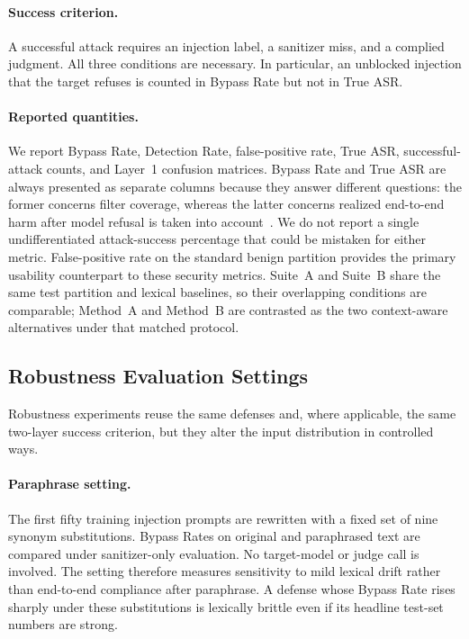 \paragraph{Success criterion.}
A successful attack requires an injection label, a sanitizer miss, and a complied judgment.
All three conditions are necessary.
In particular, an unblocked injection that the target refuses is counted in Bypass Rate but not in True ASR.

\paragraph{Reported quantities.}
We report Bypass Rate, Detection Rate, false-positive rate, True ASR, successful-attack counts, and Layer~1 confusion matrices.
Bypass Rate and True ASR are always presented as separate columns because they answer different questions: the former concerns filter coverage, whereas the latter concerns realized end-to-end harm after model refusal is taken into account~\cite{zizzo2025adversarial,yi2024jailbreak}.
We do not report a single undifferentiated attack-success percentage that could be mistaken for either metric.
False-positive rate on the standard benign partition provides the primary usability counterpart to these security metrics.
Suite~A and Suite~B share the same test partition and lexical baselines, so their overlapping conditions are comparable; Method~A and Method~B are contrasted as the two context-aware alternatives under that matched protocol.

\subsection{Robustness Evaluation Settings}
\label{sec:robustness-setup}

Robustness experiments reuse the same defenses and, where applicable, the same two-layer success criterion, but they alter the input distribution in controlled ways.

\paragraph{Paraphrase setting.}
The first fifty training injection prompts are rewritten with a fixed set of nine synonym substitutions.
Bypass Rates on original and paraphrased text are compared under sanitizer-only evaluation.
No target-model or judge call is involved.
The setting therefore measures sensitivity to mild lexical drift rather than end-to-end compliance after paraphrase.
A defense whose Bypass Rate rises sharply under these substitutions is lexically brittle even if its headline test-set numbers are strong.

